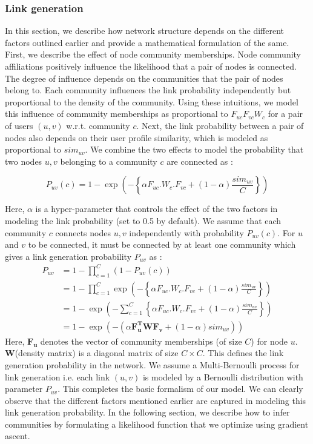 \documentclass[11pt]{article}
\begin{document}
\subsubsection*{Link generation}
In this section, we  describe how network structure depends on the different factors  outlined earlier and provide a mathematical formulation of the same.  First, we describe the effect of node community memberships.
Node community affiliations positively influence the likelihood that a pair of nodes is connected. The degree of influence depends on the communities that the pair of nodes belong to. Each community influences the link probability independently but proportional to the density of the community. Using these intuitions, we model this influence of community memberships as proportional to $F_{uc} F_{vc} W_c$ for a pair of users $(u,v)$ w.r.t. community $c$.
Next, the link probability between a pair of nodes also depends on their user profile similarity, which is modeled as proportional to $sim_{uv}$.  We combine the two effects to model the probability that two nodes $u, v$ belonging to a community $c$ are connected as : 

\[ P_{uv} (c) = 1 - \exp(- \left\lbrace \alpha F_{uc}. W_c. F_{vc} + (1 - \alpha) \frac{sim_{uv}}{C} \right\rbrace ) \]

Here, $\alpha$ is a hyper-parameter that controls the effect of the two factors in modeling the link probability (set to 0.5 by default). We assume that each community $c$ connects nodes $u,v$ independently with probability $P_{uv} (c)$.  For $u$ and $v$ to be connected, it must be connected by at least one community which gives a link generation probability $P_{uv}$ as : 
\begin{align*}
P_{uv} &=  1 - \prod_{c=1}^C (1 - P_{uv}(c) )  \\
 &=1 - \prod_{c=1}^C \exp(- \left\lbrace \alpha F_{uc}. W_c. F_{vc} + (1 - \alpha) \frac{sim_{uv}}{C} \right\rbrace ) \\
 &= 1 - \exp( -\sum\limits_{c=1}^C \left\lbrace \alpha F_{uc}. W_c. F_{vc} + (1 - \alpha) \frac{sim_{uv}}{C} \right\rbrace)  \\
 &= 1 - \exp( - ( \alpha \mathbf{F_u^{T}} \mathbf{W} \mathbf{F_v} + (1 - \alpha) sim_{uv}))
\end{align*}
Here, $\mathbf{F_u}$ denotes the vector of community memberships (of size $C$) for node $u$. $\mathbf{W}$(density matrix) is a diagonal matrix of size $C \times C$.
This defines the link generation probability in the network. We assume a Multi-Bernoulli process for link generation i.e. each link $(u,v)$ is modeled by a Bernoulli distribution with parameter $P_{uv}$.  This completes the basic formalism of our model. We can clearly observe that the different factors mentioned earlier are captured in modeling this link generation probability. In the following section, we describe how to infer communities by formulating a likelihood function that we optimize using gradient ascent. 
\end{document}

